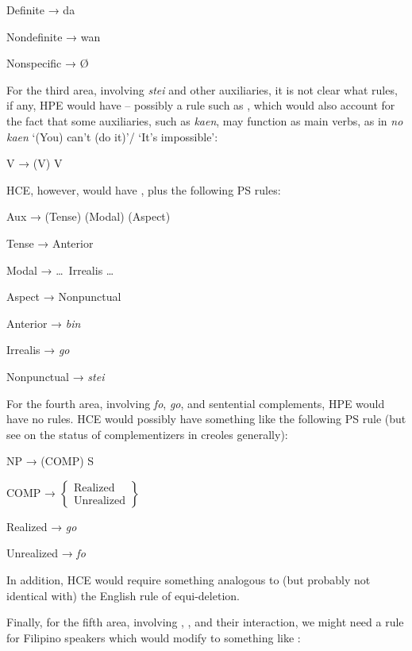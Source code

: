 \ea\label{ex:94}
{\rm Definite}  → da
\z

\ea\label{ex:95}
{\rm Nondefinite} → wan
\z

\ea\label{ex:96}
{\rm Nonspecific} → \O
\z

For the third area, involving \textit{stei} and other auxiliaries, it is not clear what rules, if any, HPE would have -- possibly a rule such as , which would also account for the fact that some auxiliaries, such as \textit{kaen}, may function as main verbs, as in \textit{no kaen} `(You) can't (do it)'/ `It's impossible':

\ea\label{ex:97}
V → (V) V
\z

\noindent HCE, however, would have , plus the following PS rules:

\ea\label{ex:98}
 Aux → (Tense) (Modal) (Aspect)
\z

\ea\label{ex:99}
 Tense → Anterior
\z
{}

\ea\label{ex:100}
 Modal → \ldots~Irrealis \ldots
\z

\ea\label{ex:101}
 Aspect → Nonpunctual
\z

\ea\label{ex:102}
 {\rm Anterior} → \textit{bin}
\z

\ea\label{ex:103}
 {\rm Irrealis} → \textit{go}
\z

\ea\label{ex:104}
 {\rm Nonpunctual} → \textit{stei}
\z


For the fourth area, involving \textit{fo}, \textit{go}, and sentential comple\-ments, HPE would have no rules. HCE would possibly have something like the following PS rule (but see  on the status of complementizers in creoles generally):

\ea\label{ex:105}
NP → (COMP) S 
\z

\ea\label{ex:106}
 COMP → $\left\{\begin{array}{l}\text{Realized}\\\text{Unrealized}\end{array}\right\}$
\z

\ea\label{ex:107}
 {\rm Realized} → \textit{go}
\z

\ea\label{ex:108}
{\rm Unrealized} → \textit{fo}
\z

\noindent In addition, HCE would require something analogous to (but probably not identical with) the English rule of equi-deletion.

Finally, for the fifth area, involving , , and their interaction, we might need a rule for Filipino speakers which would modify  to something like :

